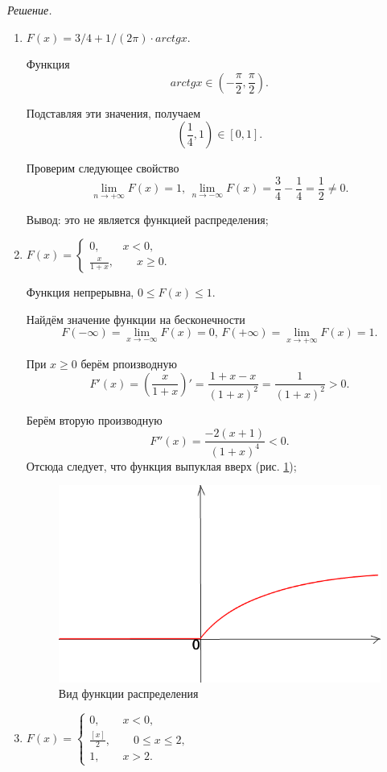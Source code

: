 \textit{Решение.}
\begin{enumerate}[label=\alph*)]
\item $F \left( x \right) = 3/4 + 1/ \left( 2 \pi \right) \cdot arctg x $.

Функция
$$arctg x \in \left( - \frac{ \pi }{2}, \frac{ \pi }{2} \right).$$

Подставляя эти значения, получаем
$$ \left( \frac{1}{4}, 1 \right) \in \left[ 0, 1 \right].$$

Проверим следующее свойство
$$ \lim \limits_{n \to + \infty } F \left( x \right) = 1, \,
\lim \limits_{n \to - \infty } F \left( x \right) =
\frac{3}{4} - \frac{1}{4} =
\frac{1}{2} \neq
0.$$

Вывод: это не является функцией распределения;
\item $F \left( x \right) =
\begin{cases}
0, \qquad x < 0, \\
\frac{x}{1+x}, \qquad x \geq 0.
\end{cases}$

Функция непрерывна, $0 \leq F \left( x \right) \leq 1$.

Найдём значение функции на бесконечности
$$F \left( - \infty \right) =
\lim \limits_{x \to - \infty } F \left( x \right) =
0, \,
F \left( + \infty \right) =
\lim \limits_{x \to + \infty } F \left( x \right) =
1.$$

При $x \geq 0$ берём рпоизводную
$$F' \left( x \right) =
\left( \frac{x}{1+x} \right)' =
\frac{1+x-x}{ \left( 1+x \right)^2} =
\frac{1}{ \left( 1+x \right)^2} >
0.$$

Берём вторую производную
$$F'' \left( x \right) =
\frac{-2 \left( x+1 \right) }{ \left( 1+x \right)^4} <
0.$$
Отсюда следует, что функция выпуклая вверх (рис. \ref{fig:94});

\begin{figure}[h!]
  \centering
  \includegraphics[width=.4\textwidth]{./pictures/9_4.png}
  \caption{Вид функции распределения}
  \label{fig:94}
\end{figure}

\item $F \left( x \right) =
\begin{cases}
0, \qquad x < 0, \\
\frac{ \left[ x \right] }{2}, \qquad 0 \leq x \leq 2, \\
1, \qquad x > 2.
\end{cases}$


\end{enumerate}
